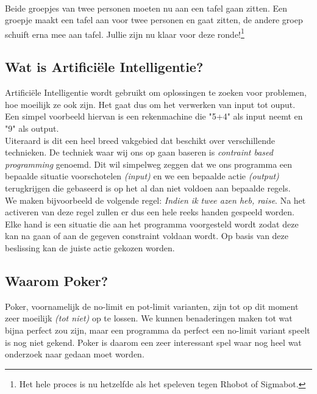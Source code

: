 \documentclass{article}
\begin{document}
    \paragraph{} Beide groepjes van twee personen moeten nu aan een tafel gaan zitten. Een groepje maakt een tafel aan voor twee personen en gaat zitten, de andere groep schuift erna mee aan tafel. Jullie zijn nu klaar voor deze ronde!\footnote{Het hele proces is nu hetzelfde als het speleven tegen Rhobot of Sigmabot.}
    
    \subsection{Wat is Artifici\"ele Intelligentie?}
    
    Artifici\"ele Intelligentie wordt gebruikt om oplossingen te zoeken voor problemen, hoe moeilijk ze ook zijn. Het gaat dus om het verwerken van input tot ouput. Een simpel voorbeeld hiervan is een rekenmachine die "5+4" als input neemt en "9" als output.\\
    
    Uiteraard is dit een heel breed vakgebied dat beschikt over verschillende technieken. De techniek waar wij ons op gaan baseren is \emph{contraint based programming} genoemd. Dit wil simpelweg zeggen dat we ons programma een bepaalde situatie voorschotelen \emph{(input)} en we een bepaalde actie \emph{(output)} terugkrijgen die gebaseerd is op het al dan niet voldoen aan bepaalde regels.\\
    
    We maken bijvoorbeeld de volgende regel: \emph{Indien ik twee azen heb, raise}. Na het activeren van deze regel zullen er dus een hele reeks handen gespeeld worden. Elke hand is een situatie die aan het programma voorgesteld wordt zodat deze kan na gaan of aan de gegeven constraint voldaan wordt. Op basis van deze beslissing kan de juiste actie gekozen worden.    
    
   	\subsection{Waarom Poker?}
    
    Poker, voornamelijk de no-limit en pot-limit varianten, zijn tot op dit moment zeer moeilijk \emph{(tot niet)} op te lossen. We kunnen benaderingen maken tot wat bijna perfect zou zijn, maar een programma da perfect een no-limit variant speelt is nog niet gekend. Poker is daarom een zeer interessant spel waar nog heel wat onderzoek naar gedaan moet worden.
    
\end{document}
